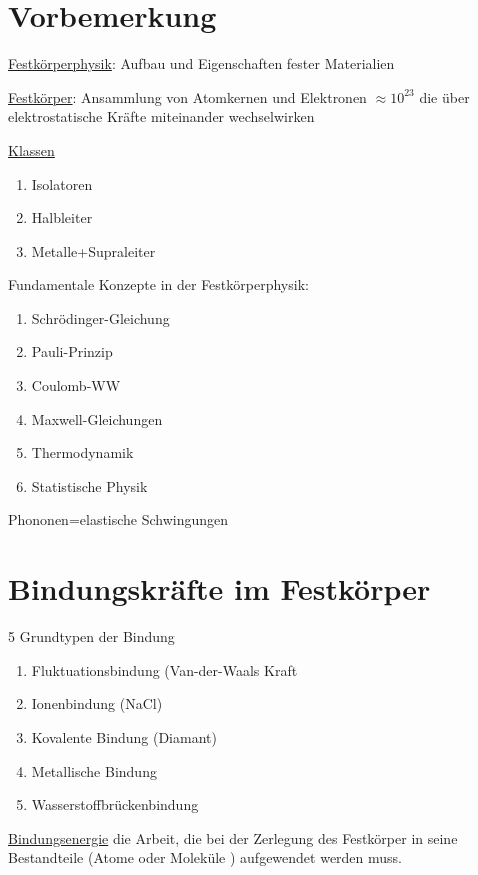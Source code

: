 



\setcounter{chapter}{0}
\chapter*{Vorbemerkung}

\underline{Festkörperphysik}: Aufbau und Eigenschaften fester Materialien

\underline{Festkörper}: Ansammlung von Atomkernen und Elektronen \(\approx
10^{23}\) die über elektrostatische Kräfte miteinander wechselwirken

\underline{Klassen}
\begin{enumerate}
\item Isolatoren
\item Halbleiter
\item Metalle+Supraleiter
\end{enumerate}

Fundamentale Konzepte in der Festkörperphysik:

\begin{enumerate}
\item Schrödinger-Gleichung
\item Pauli-Prinzip
\item Coulomb-WW
\item Maxwell-Gleichungen
\item Thermodynamik
\item Statistische Physik
\end{enumerate}

 Phononen=elastische Schwingungen

\chapter{Bindungskräfte im Festkörper}
5 Grundtypen der Bindung
\begin{enumerate}
\item Fluktuationsbindung (Van-der-Waals Kraft
\item Ionenbindung (NaCl)
\item Kovalente Bindung (Diamant)
\item Metallische Bindung
\item Wasserstoffbrückenbindung
\end{enumerate}

\underline{Bindungsenergie} 
die Arbeit, die bei der Zerlegung des Festkörper in seine Bestandteile (Atome
oder Moleküle ) aufgewendet werden muss.

